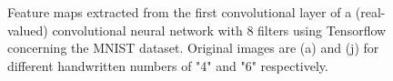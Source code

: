 \begin{figure}
{		\label{fig:6feat7}
	}
	\caption{Feature maps extracted from the first convolutional layer of a (real-valued) convolutional neural network with 8 filters using Tensorflow concerning the MNIST dataset. Original images are (a) and (j) for different handwritten numbers of "4" and "6" respectively.}
	\label{fig:feats}
\end{figure}

\begin{figure}
	\centering
	\begin{minipage}{\linewidth}
		\centering
\end{minipage}
\end{figure}
